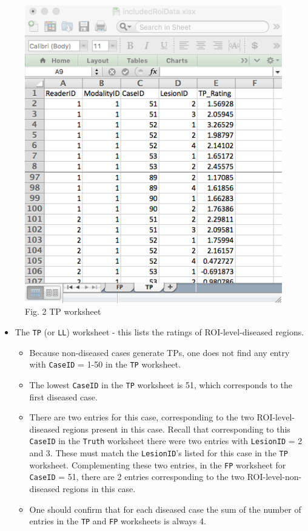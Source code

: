 \documentclass[]{book}
\providecommand{\tightlist}{%
  \setlength{\itemsep}{0pt}\setlength{\parskip}{0pt}}
\begin{document}
\begin{figure}

{\centering \includegraphics[width=0.5\linewidth,height=0.2\textheight]{images/ROI-TP-1} 

}

\caption{Fig. 2 TP worksheet}\label{fig:unnamed-chunk-5}
\end{figure}

\begin{itemize}
\tightlist
\item
  The \texttt{TP} (or \texttt{LL}) worksheet - this lists the ratings of ROI-level-diseased regions.

  \begin{itemize}
  \tightlist
  \item
    Because non-diseased cases generate TPs, one does not find any entry with \texttt{CaseID} = 1-50 in the \texttt{TP} worksheet.\\
  \item
    The lowest \texttt{CaseID} in the \texttt{TP} worksheet is 51, which corresponds to the first diseased case.\\
  \item
    There are two entries for this case, corresponding to the two ROI-level-diseased regions present in this case. Recall that corresponding to this \texttt{CaseID} in the \texttt{Truth} worksheet there were two entries with \texttt{LesionID} = 2 and 3. These must match the \texttt{LesionID}'s listed for this case in the \texttt{TP} worksheet. Complementing these two entries, in the \texttt{FP} worksheet for \texttt{CaseID} = 51, there are 2 entries corresponding to the two ROI-level-non-diseased regions in this case.\\
  \item
    One should confirm that for each diseased case the sum of the number of entries in the \texttt{TP} and \texttt{FP} worksheets is always 4.
  \end{itemize}
\end{itemize}
\end{document}

